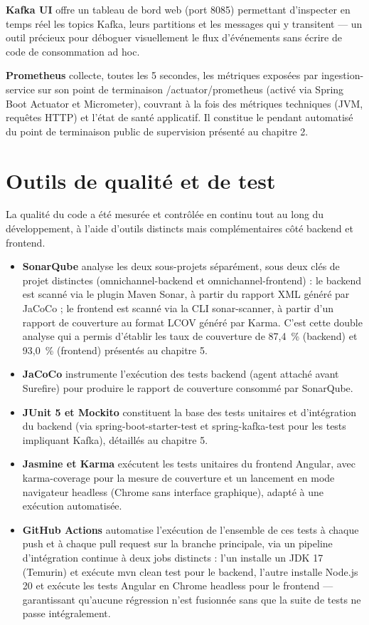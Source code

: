 \documentclass[12pt,a4paper]{report}
\begin{document}
\textbf{Kafka UI} offre un tableau de bord web (port 8085) permettant d'inspecter en temps réel les topics Kafka, leurs partitions et les messages qui y transitent --- un outil précieux pour déboguer visuellement le flux d'événements sans écrire de code de consommation ad hoc.

\textbf{Prometheus} collecte, toutes les 5 secondes, les métriques exposées par ingestion-service sur son point de terminaison /actuator/prometheus (activé via Spring Boot Actuator et Micrometer), couvrant à la fois des métriques techniques (JVM, requêtes HTTP) et l'état de santé applicatif. Il constitue le pendant automatisé du point de terminaison public de supervision présenté au chapitre 2.

\section{Outils de qualité et de test}

La qualité du code a été mesurée et contrôlée en continu tout au long du développement, à l'aide d'outils distincts mais complémentaires côté backend et frontend.

\begin{itemize}
  \item \textbf{SonarQube} analyse les deux sous-projets séparément, sous deux clés de projet distinctes (omnichannel-backend et omnichannel-frontend) : le backend est scanné via le plugin Maven Sonar, à partir du rapport XML généré par JaCoCo ; le frontend est scanné via la CLI sonar-scanner, à partir d'un rapport de couverture au format LCOV généré par Karma. C'est cette double analyse qui a permis d'établir les taux de couverture de 87,4~\% (backend) et 93,0~\% (frontend) présentés au chapitre 5.
  \item \textbf{JaCoCo} instrumente l'exécution des tests backend (agent attaché avant Surefire) pour produire le rapport de couverture consommé par SonarQube.
  \item \textbf{JUnit 5 et Mockito} constituent la base des tests unitaires et d'intégration du backend (via spring-boot-starter-test et spring-kafka-test pour les tests impliquant Kafka), détaillés au chapitre 5.
  \item \textbf{Jasmine et Karma} exécutent les tests unitaires du frontend Angular, avec karma-coverage pour la mesure de couverture et un lancement en mode navigateur headless (Chrome sans interface graphique), adapté à une exécution automatisée.
  \item \textbf{GitHub Actions} automatise l'exécution de l'ensemble de ces tests à chaque push et à chaque pull request sur la branche principale, via un pipeline d'intégration continue à deux jobs distincts : l'un installe un JDK 17 (Temurin) et exécute mvn clean test pour le backend, l'autre installe Node.js 20 et exécute les tests Angular en Chrome headless pour le frontend --- garantissant qu'aucune régression n'est fusionnée sans que la suite de tests ne passe intégralement.
\end{itemize}
\end{document}
